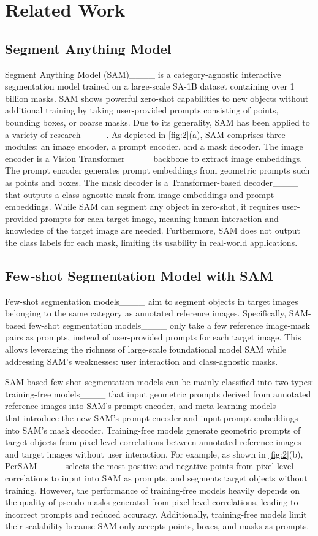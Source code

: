 \section{Related Work}
\subsection{Segment Anything Model}
Segment Anything Model (SAM)____ is a category-agnostic interactive segmentation model trained on a large-scale SA-1B dataset containing over 1 billion masks. SAM shows powerful zero-shot capabilities to new objects without additional training by taking user-provided prompts consisting of points, bounding boxes, or coarse masks. Due to its generality, SAM has been applied to a variety of research____. As depicted in \cref{fig:2}(a), SAM comprises three modules: an image encoder, a prompt encoder, and a mask decoder. The image encoder is a Vision Transformer____ backbone to extract image embeddings. The prompt encoder generates prompt embeddings from geometric prompts such as points and boxes. The mask decoder is a Transformer-based decoder____ that outputs a class-agnostic mask from image embeddings and prompt embeddings. While SAM can segment any object in zero-shot, it requires user-provided prompts for each target image, meaning human interaction and knowledge of the target image are needed. Furthermore, SAM does not output the class labels for each mask, limiting its usability in real-world applications.

\subsection{Few-shot Segmentation Model with SAM}
Few-shot segmentation models____ aim to segment objects in target images belonging to the same category as annotated reference images. Specifically, SAM-based few-shot segmentation models____ only take a few reference image-mask pairs as prompts, instead of user-provided prompts for each target image. This allows leveraging the richness of large-scale foundational model SAM while addressing SAM's weaknesses: user interaction and class-agnostic masks.

SAM-based few-shot segmentation models can be mainly classified into two types: training-free models____ that input geometric prompts derived from annotated reference images into SAM's prompt encoder, and meta-learning models____ that introduce the new SAM's prompt encoder and input prompt embeddings into SAM's mask decoder. Training-free models generate geometric prompts of target objects from pixel-level correlations between annotated reference images and target images without user interaction. For example, as shown in \cref{fig:2}(b), PerSAM____ selects the most positive and negative points from pixel-level correlations to input into SAM as prompts, and segments target objects without training. However, the performance of training-free models heavily depends on the quality of pseudo masks generated from pixel-level correlations, leading to incorrect prompts and reduced accuracy. Additionally, training-free models limit their scalability because SAM only accepts points, boxes, and masks as prompts.

